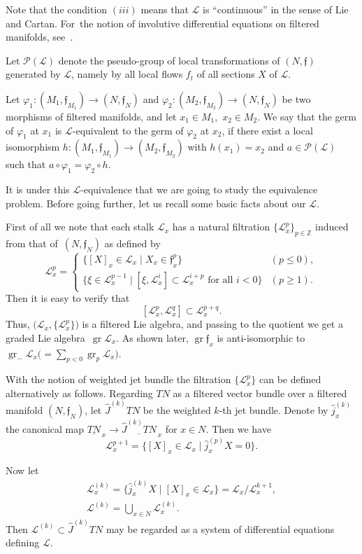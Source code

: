 \documentclass[pdftex]{sigma}%
\newcommand{\Z}{\mathbb Z}
\newcommand{\cL}{\mathcal L}
\newcommand{\cP}{\mathcal P}
\newcommand{\f}{\mathfrak f}
\newcommand{\wJ}{\widehat J}
\newcommand{\wj}{\hat j}
\newcommand{\gr}{\operatorname{gr}}
\numberwithin{equation}{section}
\begin{document}
Note that the condition $(iii)$ means that $\cL$ is ``continuous'' in the sense of Lie and Cartan. For~the notion of involutive differential equations on filtered manifolds, see~\cite{Mor2002}.

Let $\cP(\cL)$ denote the pseudo-group of local transformations of $(N,\f)$ generated by $\cL$, namely by all local flows $f_t$ of all sections $X$ of $\cL$.

Let $\varphi_1\colon (M_1,\f_{M_1})\to (N,\f_N)$ and $\varphi_2\colon (M_2,\f_{M_2})\to (N,\f_N)$ be two morphisms of filtered manifolds, and let $x_1\in M_1$,\ $x_2\in M_2$.
We say that the germ of $\varphi_1$ at $x_1$ is $\cL$-equivalent to the germ of $\varphi_2$ at $x_2$, if there exist a local isomorphism $h\colon (M_1,\f_{M_1})\to (M_2,\f_{M_2})$ with $h(x_1)=x_2$ and $a\in \cP(\cL)$ such that $a\circ \varphi_1=\varphi_2\circ h$.

It is under this $\cL$-equivalence that we are going to study the equivalence problem. Before going further, let us recall some basic facts about our $\cL$.

First of all we note that each stalk $\cL_x$ has a natural filtration $\{\cL^p_x\}_{p\in\Z}$ induced from that of~$(N, \f_N)$ as defined by
\[
\cL_x^p =\begin{cases}
\big\{ [X]_x\in \cL_x \mid X_x \in\f^p_x \big\} & (p\le 0) ,
\\[1mm]
\big\{ \xi \in \cL^{p-1}_x \mid [\xi , \cL^i_x ] \subset \cL^{i+p}_x \text{ for all } i<0\big\} & (p\ge 1).
\end{cases}
\]
Then it is easy to verify that
\[
[\cL^p_x, \cL^q_x] \subset \cL^{p+q}_x.
\]
Thus, $\big(\cL_x, \{\cL^p_x\}\big)$ is a filtered Lie algebra, and passing to the quotient we get a graded Lie algebra~$\gr \cL_x$. As shown later, $\gr\f_x$ is anti-isomorphic to $\gr_{-} \cL_x \big({}=\sum_{p<0} \gr_p \cL_x\big)$.

With the notion of weighted jet bundle the filtration $\{\cL^p_x\}$ can be defined alternatively as follows. Regarding $TN$ as a filtered vector bundle over a filtered manifold $(N,\f_N)$, let $\wJ^{(k)}TN$ be the weighted $k$-th jet bundle. Denote by $\wj^{(k)}_x$ the canonical map $\underline{TN}_{\,x} \to \underline{\wJ^{(k)}TN}_{\,x}$ for $x\in N$. Then we have
\[
\cL^{p+1}_x = \big\{ [X]_x\in\cL_x \mid \wj^{(p)}_x X = 0 \big\}.
\]

Now let
\begin{gather*}
\cL^{(k)}_x =\big \{ \wj^{(k)}_xX \mid [X]_x\in \cL_x\big\} = \cL_x / \cL_x^{k+1},
\\
\cL^{(k)} = \bigcup_{x\in N} \cL^{(k)}_x.
\end{gather*}
Then $\cL^{(k)}\subset \wJ^{(k)}TN$ may be regarded as a system of differential equations defining $\cL$.
\end{document}
